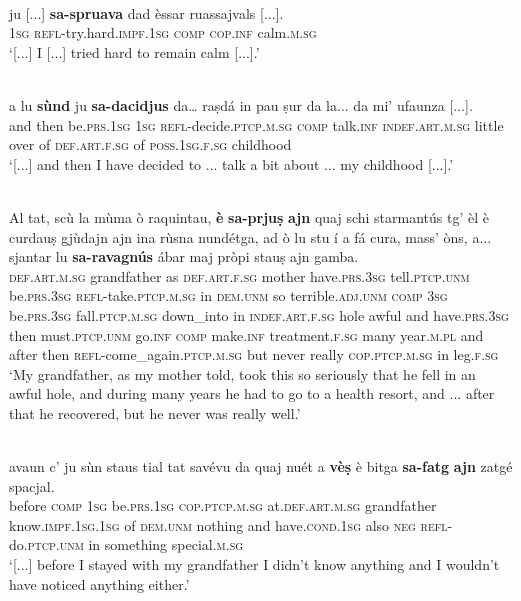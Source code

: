 \ea\label{ex:refessar1}
\\
\gll [...] ju [...] \textbf{sa-spruava} dad èssar ruassajvals [...].\\
{} \textsc{1sg} {}  \textsc{refl-}try.hard.\textsc{impf.1sg} \textsc{comp} \textsc{cop.inf} calm.\textsc{m.sg}\\
\glt `[...] I [...] tried hard to remain calm [...].'
\z

\ea\label{ex:refessar2}
\\
\gll [...] a lu \textbf{sùnd} ju \textbf{sa-dacidjus} da… raṣdá in pau ṣur da la... da mi’ ufaunza [...].   \\
{} and then  be.\textsc{prs.1sg}  \textsc{1sg}  \textsc{refl}-decide.\textsc{ptcp.m.sg}  \textsc{comp} talk.\textsc{inf} \textsc{indef.art.m.sg} little over of  \textsc{def.art.f.sg} of \textsc{poss.1sg.f.sg} childhood\\
\glt `[...] and then I have decided to ... talk a bit about ... my childhood [...].'
\z

\ea\label{ex:refessar3}
\\
\gll  Al tat, scù la mùma ò raquintau, \textbf{è}  \textbf{sa-prjuṣ} \textbf{ajn} quaj schi starmantús tg’ èl è curdauṣ gjùdajn ajn ina rùsna nundétga, ad ò lu stu í a fá cura, mass’ òns, a... sjantar lu  \textbf{sa-ravagnús} ábar maj pròpi stauṣ ajn gamba.  \\
\textsc{def.art.m.sg} grandfather as  \textsc{def.art.f.sg} mother have.\textsc{prs.3sg} tell.\textsc{ptcp.unm} be.\textsc{prs.3sg} \textsc{refl-}take.\textsc{ptcp.m.sg} in \textsc{dem.unm} so terrible.\textsc{adj.unm} \textsc{comp} \textsc{3sg} be.\textsc{prs.3sg} fall.\textsc{ptcp.m.sg} down\_into in \textsc{indef.art.f.sg} hole awful and have.\textsc{prs.3sg} then must.\textsc{ptcp.unm} go.\textsc{inf} \textsc{comp} make.\textsc{inf} treatment.\textsc{f.sg} many year.\textsc{m.pl} and after then \textsc{refl}-come\_again.\textsc{ptcp.m.sg} but never really \textsc{cop.ptcp.m.sg} in leg.\textsc{f.sg}\\
\glt `My grandfather, as my mother told, took this so seriously that he fell in an awful hole, and during many years he had to go to a health resort, and ... after that he recovered, but he never was really well.'
\z

\ea\label{ex:refvaj1}
\\
\gll  [...] avaun c’ ju sùn staus tial tat savévu da quaj nuét a \textbf{vèṣ} è bitga \textbf{sa-fatg} \textbf{ajn} zatgé spacjal.\\
{} before \textsc{comp} \textsc{1sg} be.\textsc{prs.1sg} \textsc{cop.ptcp.m.sg} at.\textsc{def.art.m.sg} grandfather know.\textsc{impf.1sg.1sg} of \textsc{dem.unm} nothing and have.\textsc{cond.1sg} also \textsc{neg} \textsc{refl-}do.\textsc{ptcp.unm} in something special.\textsc{m.sg}\\
\glt `[...] before I stayed with my grandfather I didn’t know anything and I wouldn’t have noticed anything either.'
\z

